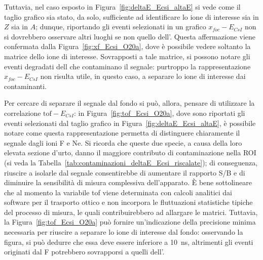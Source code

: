 Tuttavia, nel caso esposto in Figura~\ref{fig:deltaE_Ecsi_altaE} si vede come il taglio grafico sia stato, da solo, sufficiente ad identificare lo ione di interesse sia in $Z$ sia in $A$; dunque, riportando gli eventi selezionati in un grafico $x_{foc} - E_{CsI}$ non si dovrebbero osservare altri luoghi se non quello dell'.
Questa affermazione viene confermata dalla Figura~\ref{fig:xf_Ecsi_O20a}, dove è possibile vedere soltanto la matrice dello ione di interesse.
Sovrapposti a tale matrice, si possono notare gli eventi degradati dell che contaminano il segnale: purtroppo la rappresentazione $x_{foc} - E_{CsI}$ non risulta utile, in questo caso, a separare lo ione di interesse dai contaminanti.

Per cercare di separare il segnale dal fondo si può, allora, pensare di utilizzare la correlazione $\mbox{tof} - E_{CsI}$: in Figura~\ref{fig:tof_Ecsi_O20a}, dove sono riportati gli eventi selezionati dal taglio grafico in Figura~\ref{fig:deltaE_Ecsi_altaE}, è possibile notare come questa rappresentazione permetta di distinguere chiaramente il segnale dagli ioni F e Ne.
Si ricorda che queste due specie, a causa della loro elevata sezione d'urto, danno il maggiore contributo di contaminazione nella ROI (si veda la Tabella~\ref{tab:contaminazioni_deltaE_Ecsi_riscalate}); di conseguenza, riuscire a isolarle dal segnale consentirebbe di aumentare il rapporto S/B e di diminuire la sensibilità di misura complessiva dell'apparato.
È bene sottolineare che al momento la variabile tof viene determinata con calcoli analitici dai software per il trasporto ottico e non incorpora le fluttuazioni statistiche tipiche del processo di misura, le quali contribuirebbero ad allargare le matrici.
Tuttavia, la Figura~\ref{fig:tof_Ecsi_O20a} può fornire un'indicazione della precisione minima necessaria per riuscire a separare lo ione di interesse dal fondo: osservando la figura, si può dedurre che essa deve essere inferiore a 10~ns, altrimenti gli eventi originati dal F potrebbero sovrapporsi a quelli dell'.

